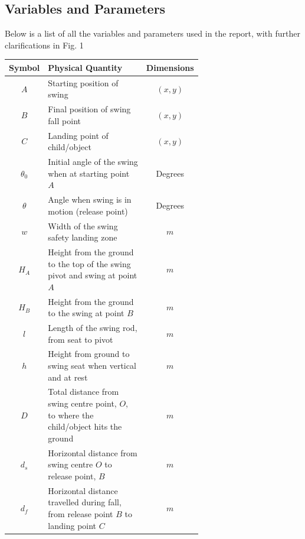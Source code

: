 \documentclass{article}
\begin{document}
\subsection*{Variables and Parameters}
Below is a list of all the variables and parameters used in the report, with further clarifications in Fig. 1

\begin{table}[H]
\begin{tabular}{|c|>{\raggedright\arraybackslash}p{0.65\linewidth}|c|}
\hline
Symbol    & Physical Quantity                                                                      & Dimensions \\ \hline
$A$       & Starting position of swing                                                             & $(x,y)$    \\ \hline
$B$       & Final position of swing fall point                                                     & $(x,y)$    \\ \hline
$C$       & Landing point of child/object                                                          & $(x,y)$    \\ \hline
\( \theta_0 \) & Initial angle of the swing when at starting point $A$                                  & Degrees    \\ \hline
\( \theta \)   & Angle when swing is in motion (release point)                                          & Degrees    \\ \hline
$w$       & Width of the swing safety landing zone                                                 & $m$        \\ \hline
$H_A$   & Height from the ground to the top of the swing pivot and swing at point $A$&    $m$        \\   \hline
$H_B$   &  Height from the ground to the swing at point $B$     &$m$        \\  \hline
$l$       & Length of the swing rod, from seat to pivot                                            & $m$        \\ \hline
$h$       & Height from ground to swing seat when vertical and at rest                             & $m$        \\ \hline
$D$       & Total distance from swing centre point, $O$, to where the child/object hits the ground & $m$        \\ \hline
$d_s$     & Horizontal distance from swing centre $O$ to release point, $B$                        & $m$        \\ \hline
$d_f$     & Horizontal distance travelled during fall, from release point $B$ to landing point $C$ & $m$        \\ \hline

\end{tabular}
\end{table}
\end{document}
